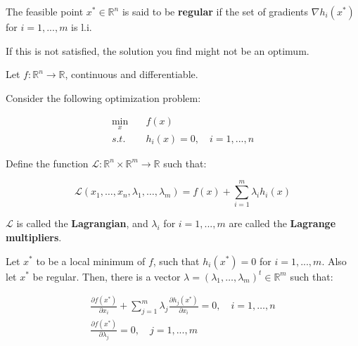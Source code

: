 \documentclass[aspectratio=169]{beamer}
\begin{document}
\begin{frame}
    \begin{definition}
        The feasible point $x^*\in\mathds{R}^n$ is said to be \textbf{regular} if the set of gradients $\nabla h_i(x^*)$ for $i=1,...,m$ is l.i.
    \end{definition}
    
    \vspace{0.5cm}
    
    If this is not satisfied, the solution you find might not be an optimum.
\end{frame}

\begin{frame}
    \begin{definition}
    
    Let $f:\mathds{R}^n\rightarrow\mathds{R}$, continuous and differentiable.
    
    Consider the following optimization problem:
    
    \begin{align*}
        \min_{x}\quad &f(x)\\
        s.t.\quad & h_i(x)=0,\quad i=1,...,n
    \end{align*}
    
    Define the function $\mathcal{L}:\mathds{R}^n\times\mathds{R}^m\rightarrow\mathds{R}$ such that:
    
    $$\mathcal{L}(x_1,\ldots,x_n,\lambda_1,\dots,\lambda_m)=f(x)+\sum_{i=1}^{m}\lambda_i h_i(x)$$
    
    $\mathcal{L}$ is called the  \textbf{Lagrangian}, and $\lambda_i$ for $i=1,...,m$ are called the \textbf{Lagrange multipliers}.
    
    \end{definition}
\end{frame}

\begin{frame}
\begin{theorem}
    Let $x^*$ to be a local minimum of $f$, such that $h_i(x^*)=0$ for $i=1,...,m$. Also let $x^*$ be regular. Then, there is a vector $\lambda=(\lambda_1,\dots,\lambda_m)^t\in\mathds{R}^m$ such that:
    
    \begin{align*}
        \frac{\partial f(x^*)}{\partial x_i}+\sum_{j=1}^m\lambda_j \frac{\partial h_j(x^*)}{\partial x_i} =0, \quad i=1,\ldots,n\\
        \frac{\partial f(x^*)}{\partial \lambda_j}=0,\quad j=1,...,m
    \end{align*}
\end{theorem}
\end{frame}
\end{document}
